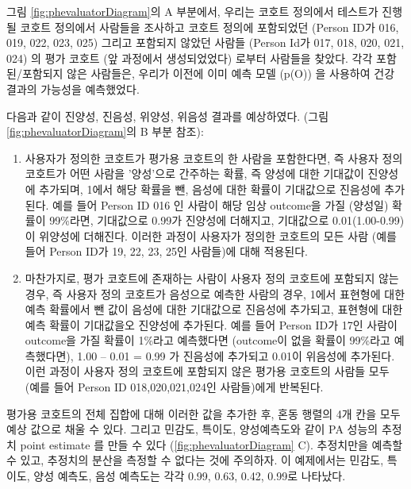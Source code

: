 \documentclass[11pt]{book}
\theoremstyle{definition}
\theoremstyle{definition}
\theoremstyle{definition}
\theoremstyle{remark}
\begin{document}
그림 \ref{fig:phevaluatorDiagram}의 A 부분에서, 우리는 코호트 정의에서
테스트가 진행될 코호트 정의에서 사람들을 조사하고 코호트 정의에
포함되었던 (Person ID가 016, 019, 022, 023, 025) 그리고 포함되지 않았던
사람들 (Person Id가 017, 018, 020, 021, 024) 의 평가 코호트 (앞 과정에서
생성되었었다) 로부터 사람들을 찾았다. 각각 포함된/포함되지 않은
사람들은, 우리가 이전에 이미 예측 모델 (p(O)) 을 사용하여 건강 결과의
가능성을 예측했었다.

다음과 같이 진양성, 진음성, 위양성, 위음성 결과를 예상하였다. (그림
\ref{fig:phevaluatorDiagram}의 B 부분 참조):

\begin{enumerate}
\def\labelenumi{\arabic{enumi}.}
\item
  사용자가 정의한 코호트가 평가용 코호트의 한 사람을 포함한다면, 즉
  사용자 정의 코호트가 어떤 사람을 '양성'으로 간주하는 확률, 즉 양성에
  대한 기대값이 진양성에 추가되며, 1에서 해당 확률을 뺀, 음성에 대한
  확률이 기대값으로 진음성에 추가된다. 예를 들어 Person ID 016 인 사람이
  해당 임상 outcome을 가질 (양성일) 확률이 99\%라면, 기대값으로 0.99가
  진양성에 더해지고, 기대값으로 0.01(1.00-0.99)이 위양성에 더해진다.
  이러한 과정이 사용자가 정의한 코호트의 모든 사람 (예를 들어 Person
  ID가 19, 22, 23, 25인 사람들)에 대해 적용된다.
\item
  마찬가지로, 평가 코호트에 존재하는 사람이 사용자 정의 코호트에
  포함되지 않는 경우, 즉 사용자 정의 코호트가 음성으로 예측한 사람의
  경우, 1에서 표현형에 대한 예측 확률에서 뺀 값이 음성에 대한 기대값으로
  진음성에 추가되고, 표현형에 대한 예측 확률이 기대값을오 진양성에
  추가된다. 예를 들어 Person ID가 17인 사람이 outcome을 가질 확률이
  1\%라고 예측했다면 (outcome이 없을 확률이 99\%라고 예측했다면), 1.00
  -- 0.01 = 0.99 가 진음성에 추가되고 0.01이 위음성에 추가된다. 이런
  과정이 사용자 정의 코호트에 포함되지 않은 평가용 코호트의 사람들 모두
  (예를 들어 Person ID 018,020,021,024인 사람들)에게 반복된다.
\end{enumerate}

평가용 코호트의 전체 집합에 대해 이러한 값을 추가한 후, 혼동 행렬의 4개
칸을 모두 예상 값으로 채울 수 있다. 그리고 민감도, 특이도, 양성예측도와
같이 PA 성능의 추정치 point estimate 를 만들 수 있다
(\ref{fig:phevaluatorDiagram} C). 추정치만을 예측할 수 있고, 추정치의
분산을 측정할 수 없다는 것에 주의하자. 이 예제에서는 민감도, 특이도,
양성 예측도, 음성 예측도는 각각 0.99, 0.63, 0.42, 0.99로 나타났다.
\end{document}
